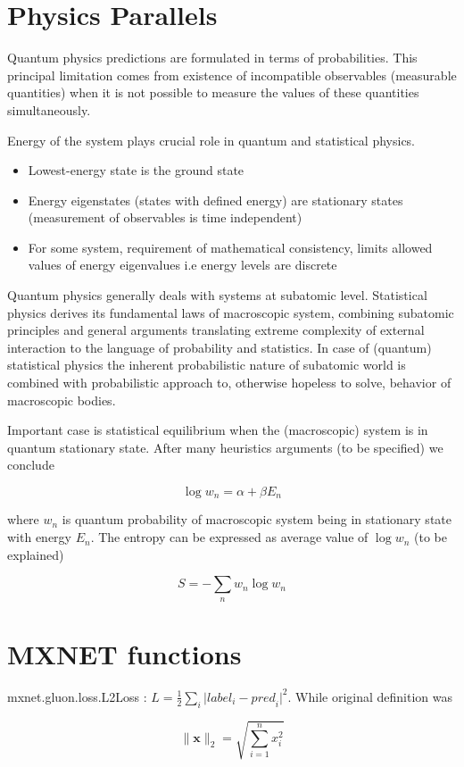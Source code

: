 \documentclass[12pt]{article}
\begin{document}
\section{Physics Parallels}

Quantum physics predictions are formulated in terms of
probabilities. This principal limitation comes from existence of incompatible observables
(measurable quantities) when it is not possible to measure the values of these quantities simultaneously.

Energy of the system plays crucial role in quantum and statistical physics.
\begin{itemize}
  \item Lowest-energy state is the ground state
  \item Energy eigenstates (states with defined energy) are stationary states (measurement of observables is time independent)
  \item For some system, requirement of mathematical consistency, limits allowed values of energy eigenvalues i.e energy levels are discrete
\end{itemize}

Quantum physics generally deals with systems at subatomic level. Statistical physics derives its fundamental laws of macroscopic system, combining subatomic principles and general arguments translating extreme complexity of external interaction to the language of probability and statistics. In case of (quantum) statistical physics the inherent probabilistic nature of subatomic world is combined with probabilistic approach to, otherwise hopeless to solve, behavior of macroscopic bodies. 

Important case is statistical equilibrium when the (macroscopic) system is in quantum stationary state. After many heuristics arguments (to be specified) we conclude

\[ \log w_n = \alpha + \beta E_n \] 

where $w_n$ is quantum probability of macroscopic system being in stationary state with energy $E_n$. The entropy can be expressed as average value of $\log w_n$ (to be explained)

\[ S = -\sum_n w_n \log w_n \] 

\section{MXNET functions}

mxnet.gluon.loss.L2Loss : $L = \frac{1}{2} \sum_i \vert {label}_i - {pred}_i \vert^2$. While original definition was

\[\|\mathbf{x}\|_2 = \sqrt{\sum_{i=1}^n x_i^2}\]
\end{document}
